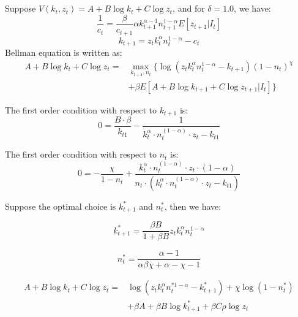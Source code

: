 \documentclass{article}
\begin{document}
\subsection{}

Suppose \(V(k_t, z_t) = A + B \log k_t + C \log z_t\), and for \(\delta = 1.0\), we have:
\[\frac{1}{c_t} =  \frac{\beta}{c_{t+1}} \alpha k_{t+1}^{\alpha - 1} n_{t+1}^{1-\alpha} E\left[z_{t+1} | I_t\right] \]
\[k_{t+1} = z_t k_t^\alpha n_t^{1-\alpha} - c_t\]
Bellman equation is written as:\\
\begin{align*}
    A +  B \log k_t + C \log z_t = & \max_{k_{t+1}, n_t} \{ \log\left(z_t k_t^\alpha n_t^{1-\alpha} - k_{t+1}\right)\left( 1 - n_t\right)^\chi \\
    & + \beta E[A + B \log k_{t+1} + C \log z_{t+1} | I_t] \}
\end{align*}

The first order condition with respect to \(k_{t+1}\) is:
\begin{equation}
   0 = \frac{{B \cdot \beta}}{{k_{t1}}} - \frac{1}{{k_t^{\alpha} \cdot n_t^{(1 - \alpha)} \cdot z_t - k_{t1}}}
\end{equation}

The first order condition with respect to \(n_t\) is:
\begin{equation}
    0 = -\frac{{\chi}}{{1 - n_t}} + \frac{{k_t^{\alpha} \cdot n_t^{(1 - \alpha)} \cdot z_t \cdot (1 - \alpha)}}{{n_t \cdot (k_t^{\alpha} \cdot n_t^{(1 - \alpha)} \cdot z_t - k_{t1})}}
\end{equation}

Suppose the optimal choice is \(k^*_{t+1}\) and \(n^*_t\), then we have:

\begin{equation}
    k^*_{t+1} = \frac{\beta B}{1 + \beta B} z_t k_t^\alpha n_t^{1-\alpha}
\end{equation}

\begin{equation}
    n^*_t = \frac{{\alpha - 1}}{{\alpha \beta \chi + \alpha - \chi - 1}}
\end{equation}

\begin{align*}
    A +  B \log k_t + C \log z_t = & \log\left(z_t k_t^\alpha n_t^{* 1-\alpha} - k^*_{t+1}\right) + \chi \log\left( 1 - n^*_t\right) \\
    & + \beta A + \beta B \log k^*_{t+1} + \beta C \rho \log z_t
\end{align*}
\end{document}
